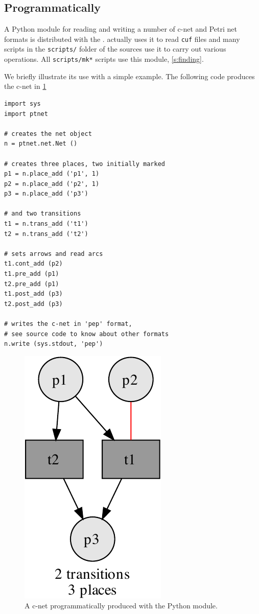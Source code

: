\documentclass[a4paper]{refart}
\begin{document}
\subsection{Programmatically}%
\label{s:program}

A Python module for reading and writing a number of c-net and Petri net
formats is distributed with the \cunft{}.
\cna actually uses it to read \verb!cuf! files and many scripts in the
\verb!scripts/! folder of the sources use it to carry out various operations.
All \verb!scripts/mk*! scripts use this module, \cf \cref{s:finding}.

We briefly illustrate its use with a simple example.  The following code
produces the c-net in \cref{f:ptnet}

\begin{verbatim}
import sys
import ptnet

# creates the net object
n = ptnet.net.Net ()

# creates three places, two initially marked
p1 = n.place_add ('p1', 1)
p2 = n.place_add ('p2', 1)
p3 = n.place_add ('p3')

# and two transitions
t1 = n.trans_add ('t1')
t2 = n.trans_add ('t2')

# sets arrows and read arcs
t1.cont_add (p2)
t1.pre_add (p1)
t2.pre_add (p1)
t1.post_add (p3)
t2.post_add (p3)

# writes the c-net in 'pep' format,
# see source code to know about other formats
n.write (sys.stdout, 'pep')
\end{verbatim}

\begin{figure}[bth]
\centering
\includegraphics[scale=0.5]{fig/ptnet.pdf}
\caption{A c-net programmatically produced with the  Python
module.}
\label{f:ptnet}
\end{figure}




\end{document}
